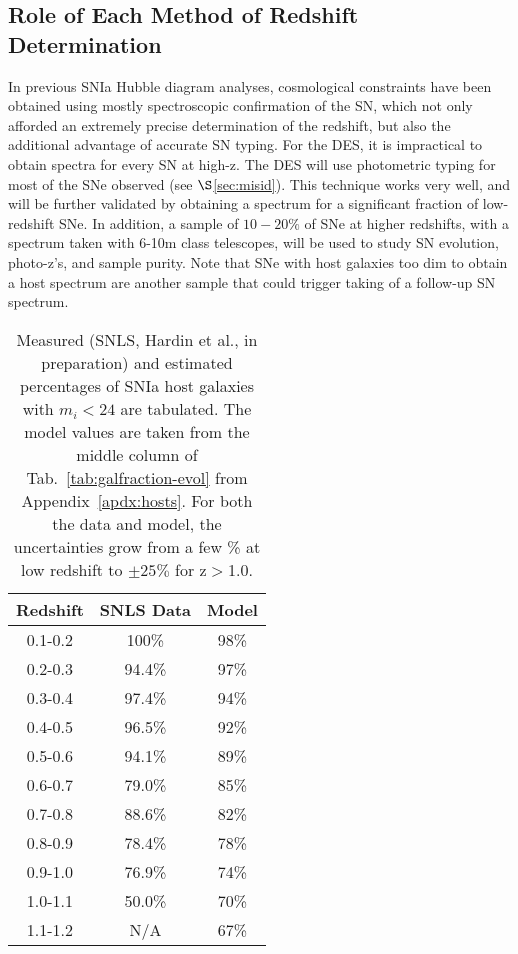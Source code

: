\documentclass[preprint2]{aastex}    %
\begin{document}
\subsection{Role of Each Method of Redshift Determination}
In previous SNIa Hubble diagram analyses, cosmological constraints have been obtained using 
mostly spectroscopic confirmation of the SN, 
which not only afforded an extremely precise determination of the redshift, but 
also the additional advantage of accurate SN typing. 
For the DES, it is impractical to obtain spectra for every SN at high-z.
The DES will use photometric typing for most of the SNe observed (see $\S$\ref{sec:misid}).
This technique works very well, and will be further validated by obtaining a spectrum for
a significant fraction of low-redshift SNe. In addition, a sample of $10-20\%$ of SNe
at higher redshifts, with a spectrum taken with 6-10m class telescopes, will be used to 
study SN evolution, photo-z's, and sample purity. Note that SNe with host galaxies 
too dim to obtain a host spectrum are another sample that could trigger taking of
a follow-up SN spectrum.

\begin{table}[h]
\centering%
\begin{tabular}
[c]{|c|c|c|}\hline
Redshift & SNLS Data & Model\\
\hline
0.1-0.2 &100\% & 98\% \\
0.2-0.3 &94.4\% & 97\% \\
0.3-0.4 &97.4\% & 94\% \\
0.4-0.5 &96.5\% & 92\% \\
0.5-0.6 &94.1\% & 89\% \\
0.6-0.7 &79.0\% & 85\% \\
0.7-0.8 &88.6\% & 82\% \\
0.8-0.9 &78.4\% & 78\% \\
0.9-1.0 &76.9\% & 74\% \\
1.0-1.1 &50.0\% & 70\% \\
1.1-1.2 &N/A & 67\% \\
\hline
\end{tabular}
\caption{Measured (SNLS, Hardin et al., in preparation) and estimated 
percentages of SNIa host galaxies with $m_i<24$ are
tabulated. The model values are taken from the 
middle column of Tab.~\ref{tab:galfraction-evol}
from Appendix~\ref{apdx:hosts}. For both the data and 
model,  the uncertainties grow from a few \% at low 
redshift to $\pm25\%$ for z$>$1.0.
}
\label{tab:galfrac}%
\end{table}
\end{document}
